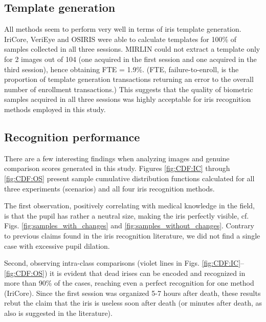 \documentclass[10pt,twocolumn,letterpaper]{article}
\begin{document}
\subsection{Template generation}

All methods seem to perform very well in terms of iris template generation. IriCore, VeriEye and OSIRIS were able to calculate templates for 100\% of samples collected in all three sessions. MIRLIN could not extract a template only for 2 images out of 104 (one acquired in the first session and one acquired in the third session), hence obtaining FTE = 1.9\%. (FTE, failure-to-enroll, is the proportion of template generation transactions returning an error to the overall number of enrollment transactions.) This suggests that the quality of biometric samples acquired in all three sessions was highly acceptable for iris recognition methods employed in this study.

\subsection{Recognition performance}

There are a few interesting findings when analyzing images and genuine comparison scores generated in this study. Figures \ref{fig:CDF:IC} through \ref{fig:CDF:OS} present sample cumulative distribution functions calculated for all three experiments (scenarios) and all four iris recognition methods.

The first observation, positively correlating with medical knowledge in the field, is that the pupil has rather a neutral size, making the iris perfectly visible, cf. Figs. \ref{fig:samples_with_changes} and \ref{fig:samples_without_changes}. Contrary to previous claims found in the iris recognition literature, we did not find a single case with excessive pupil dilation.

Second, observing intra-class comparisons (violet lines in Figs. \ref{fig:CDF:IC}--\ref{fig:CDF:OS}) it is evident that dead irises can be encoded and recognized in more than 90\% of the cases, reaching even a perfect recognition for one method (IriCore). Since the first session was organized 5-7 hours after death, these results rebut the claim that the iris is useless soon after death (or minutes after death, as also is suggested in the literature).
\end{document}
